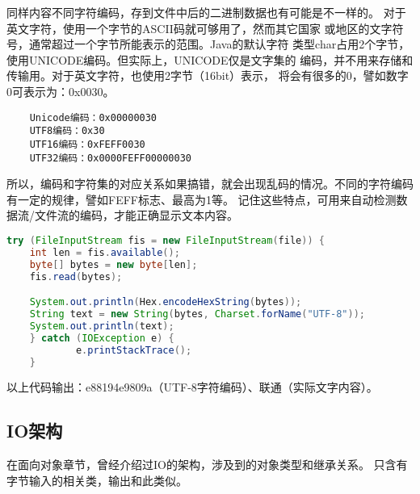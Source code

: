 同样内容不同字符编码，存到文件中后的二进制数据也有可能是不一样的。
对于英文字符，使用一个字节的ASCII码就可够用了，然而其它国家
或地区的文字符号，通常超过一个字节所能表示的范围。Java的默认字符
类型char占用2个字节，使用UNICODE编码。但实际上，UNICODE仅是文字集的
编码，并不用来存储和传输用。对于英文字符，也使用2字节（16bit）表示，
将会有很多的0，譬如数字0可表示为：0x0030。

\begin{lstlisting}
	Unicode编码：0x00000030
	UTF8编码：0x30
	UTF16编码：0xFEFF0030
	UTF32编码：0x0000FEFF00000030	
\end{lstlisting}

所以，编码和字符集的对应关系如果搞错，就会出现乱码的情况。不同的字符编码
有一定的规律，譬如FEFF标志、最高为1等。
记住这些特点，可用来自动检测数据流/文件流的编码，才能正确显示文本内容。

\begin{lstlisting}[language=java]
	try (FileInputStream fis = new FileInputStream(file)) {
    int len = fis.available();
    byte[] bytes = new byte[len];
    fis.read(bytes);

    System.out.println(Hex.encodeHexString(bytes));
    String text = new String(bytes, Charset.forName("UTF-8"));
    System.out.println(text);
	} catch (IOException e) {
			e.printStackTrace();
	}
\end{lstlisting}
\noindent
以上代码输出：e88194e9809a（UTF-8字符编码）、联通（实际文字内容）。

\subsection{IO架构}
在面向对象章节，曾经介绍过IO的架构，涉及到的对象类型和继承关系。
只含有字节输入的相关类，输出和此类似。

